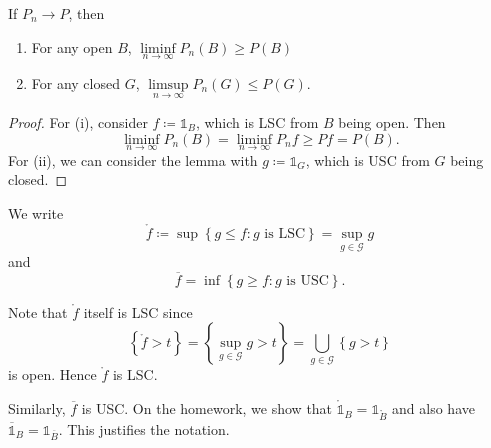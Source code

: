 \begin{corollary}
	If $P_n \to P$, then 
	\begin{enumerate}[label=(\roman*)]
		\item For any open $B$, $\liminf\limits_{n \to \infty} P_n(B) \ge P\left( B \right)$
		\item For any closed $G$, $\limsup\limits_{n \to \infty} P_n(G) \le P(G)$.
	\end{enumerate}
\end{corollary}

\begin{proof}
	For (i), consider $f \coloneqq \mathds{1}_{B}$, which is LSC from $B$ being open.
	Then \[
		\liminf\limits_{n \to \infty} P_n(B) = \liminf\limits_{n \to \infty} P_n f \ge P f = P(B)
	.\] For (ii), we can consider the lemma with $g \coloneqq \mathds{1}_{G}$, which is USC from $G$ being closed.
\end{proof}

\begin{notation}
	We write \[
		\mathring{f} \coloneqq \sup \left\{g \le f: g \text{ is LSC}\right\} = \sup_{g \in \mathscr{G}} g
	\] and \[
		\overline{f} = \inf \left\{g \ge f: g \text{ is USC}\right\}
	.\] 
\end{notation}

Note that $\mathring{f}$ itself is LSC since \[
	\left\{\mathring{f} > t\right\} = \left\{\sup_{g \in \mathscr{G}} g > t\right\} = \bigcup\limits_{g \in \mathscr{G}}^{} \left\{g > t\right\}
\] is open. Hence $\mathring{f}$ is LSC.

Similarly, $\overline{f}$ is USC. On the homework, we show that $\mathring{\mathds{1}}_B = \mathds{1}_{\mathring{B}}$ and also have $\overline{\mathds{1}}_B = \mathds{1}_{\overline{B}}$. This justifies the notation.

